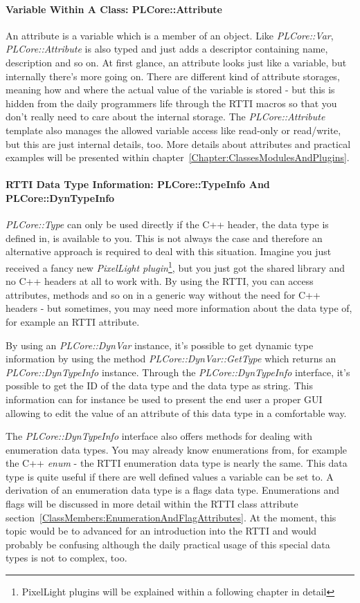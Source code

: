 \paragraph{Variable Within A Class: PLCore::Attribute}
An attribute is a variable which is a member of an object. Like \emph{PLCore::Var}, \emph{PLCore::Attribute} is also typed and just adds a descriptor containing name, description and so on. At first glance, an attribute looks just like a variable, but internally there's more going on. There are different kind of attribute storages, meaning how and where the actual value of the variable is stored - but this is hidden from the daily programmers life through the RTTI macros so that you don't really need to care about the internal storage. The \emph{PLCore::Attribute} template also manages the allowed variable access like read-only or read/write, but this are just internal details, too. More details about attributes and practical examples will be presented within chapter~\ref{Chapter:ClassesModulesAndPlugins}.


\paragraph{RTTI Data Type Information: PLCore::TypeInfo And PLCore::DynTypeInfo}
\emph{PLCore::Type} can only be used directly if the C++ header, the data type is defined in, is available to you. This is not always the case and therefore an alternative approach is required to deal with this situation. Imagine you just received a fancy new \emph{PixelLight plugin}\footnote{PixelLight plugins will be explained within a following chapter in detail}, but you just got the shared library and no C++ headers at all to work with. By using the RTTI, you can access attributes, methods and so on in a generic way without the need for C++ headers - but sometimes, you may need more information about the data type of, for example an RTTI attribute.

By using an \emph{PLCore::DynVar} instance, it's possible to get dynamic type information by using the method \emph{PLCore::DynVar::GetType} which returns an \emph{PLCore::DynTypeInfo} instance. Through the \emph{PLCore::DynTypeInfo} interface, it's possible to get the ID of the data type and the data type as string. This information can for instance be used to present the end user a proper GUI allowing to edit the value of an attribute of this data type in a comfortable way.

The \emph{PLCore::DynTypeInfo} interface also offers methods for dealing with enumeration data types. You may already know enumerations from, for example the C++ \emph{enum} - the RTTI enumeration data type is nearly the same. This data type is quite useful if there are well defined values a variable can be set to. A derivation of an enumeration data type is a flags data type. Enumerations and flags will be discussed in more detail within the RTTI class attribute section~\ref{ClassMembers:EnumerationAndFlagAttributes}. At the moment, this topic would be to advanced for an introduction into the RTTI and would probably be confusing although the daily practical usage of this special data types is not to complex, too.


